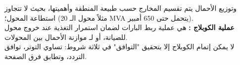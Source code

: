 \documentclass{beamer}
\newcommand{\en}{\textenglish}
\begin{document}
\begin{frame}{  وتوزيع الأحمال }
    يتم تقسيم المخارج حسب طبيعة المنطقة وأهميتها، بحيث لا تتجاوز استطاعة المحول؛ (مثلاً محول الـ \en{20 MVA} يتحمل حتى \en{650} أمبير).\\
  \textbf{\small عملية الكوبلاج :} هي عملية ربط البارات لضمان استمرار التغذية عند خروج محول للصيانة، أو لـ موازنة الأحمال بين المحولات.\\
  لا يمكن إتمام الكوبلاج إلا بتحقيق "التوافق" في ثلاثة شروط: تساوي التوتر، توافق التردد، وتطابق فرق الصفحة.
  
\end{frame}

\end{document}
